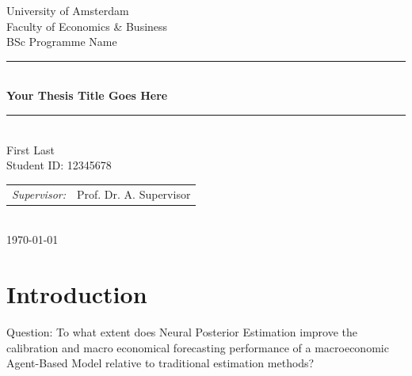 \documentclass[12pt]{article}
\def\spacingset#1{\renewcommand{\baselinestretch}%
{#1}\small\normalsize} \spacingset{1}
\newcommand{\thesistitle}{Your Thesis Title Goes Here}
\newcommand{\theauthor}{First Last}
\newcommand{\studentid}{12345678}
\newcommand{\programme}{BSc Programme Name}
\newcommand{\institution}{University of Amsterdam}
\newcommand{\department}{Faculty of Economics \& Business}
\newcommand{\supervisor}{Prof. Dr. A. Supervisor}
\newcommand{\thesisdate}{\today}
\begin{document}

\begin{titlepage}
    \centering


    {\large \institution}\\[0.3em]
    {\normalsize \department}\\[0.3em]
    {\normalsize \programme}\\[2.5em]

    \rule{\linewidth}{0.5pt}\\[0.6em]
    {\LARGE \bfseries \thesistitle}\\[0.4em]
    \rule{\linewidth}{0.5pt}\\[2em]

    {\large \theauthor}\\[0.3em]
    {\normalsize Student ID: \studentid}\\[2.5em]

    {\small
        \begin{tabular}{rl}
            \textit{Supervisor:}     & \supervisor   
        \end{tabular}
    }\\[2.5em]

    {\normalsize \thesisdate}

    \vfill
\end{titlepage}

\newpage
{}

\begin{abstract}
    \noindent
    Replace this text with your abstract. The abstract should concisely
    summarise the research question, methodology, main findings, and
    conclusions of your thesis. Aim for 150–250 words.
\end{abstract}

\newpage
\spacingset{1.45} %
\section{Introduction}
Question: To what extent does Neural Posterior Estimation improve the calibration and macro economical forecasting performance of a macroeconomic Agent-Based Model relative to traditional estimation methods?
\end{document}
